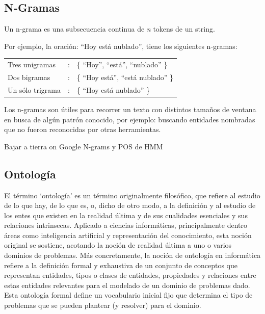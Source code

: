 \subsection*{N-Gramas}

Un n-grama es una subsecuencia continua de \textit{n} tokens de un string.

Por ejemplo, la oración: {\textquotedblleft}Hoy está nublado{\textquotedblright}, tiene los siguientes n-gramas:
\medskip

\begin{tabular}{lll}
Tres unigramas & : & \{ {\textquotedblleft}Hoy{\textquotedblright}, {\textquotedblleft}está{\textquotedblright}, {\textquotedblleft}nublado{\textquotedblright} \} \\
Dos bigramas & : & \{ {\textquotedblleft}Hoy está{\textquotedblright}, {\textquotedblleft}está nublado{\textquotedblright} \} \\
Un sólo trigrama & : & \{ {\textquotedblleft}Hoy está nublado{\textquotedblright} \}\\
\end{tabular}
\medskip

Los n-gramas son útiles para recorrer un
texto con distintos tama\~nos de ventana en busca de algún patrón
conocido, por ejemplo: buscando entidades nombradas que no fueron reconocidas por otras herramientas.

{\color{red} Bajar a tierra on Google N-grams y POS de HMM}

\subsection*{Ontología}

El término `ontología' es un término originalmente filosófico, que refiere al estudio de lo que hay, de lo que es, o, dicho de otro modo, a la definición y al estudio de los entes que existen en la realidad última y de sus cualidades esenciales y sus relaciones intrinsecas. Aplicado a ciencias informáticas, principalmente dentro áreas como inteligencia artificial y representación del conocimiento, esta noción original se sostiene, acotando la noción de realidad última a uno o varios dominios de problemas. Más concretamente, la noción de ontología en informática refiere a la definición formal y exhaustiva de un conjunto de conceptos que representan entidades, tipos o clases de entidades, propiedades y relaciones entre estas entidades relevantes para el modelado de un dominio de problemas dado. Esta ontología formal define un vocabulario inicial fijo que determina el tipo de problemas que se pueden plantear (y resolver) para el dominio.

